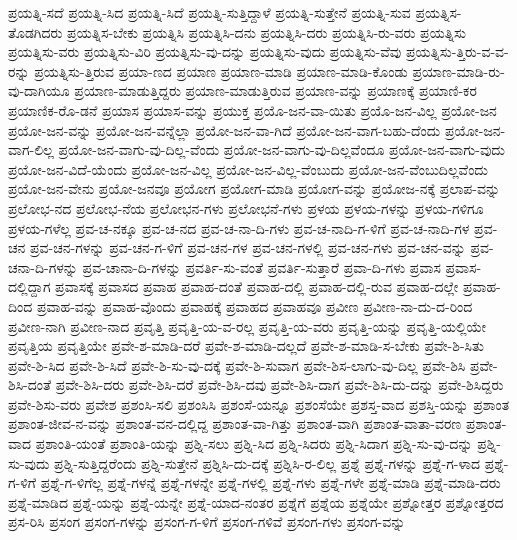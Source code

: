 {ಪ್ರಯತ್ನಿ-ಸದೆ
ಪ್ರಯತ್ನಿ-ಸಿದ
ಪ್ರಯತ್ನಿ-ಸಿದೆ
ಪ್ರಯತ್ನಿ-ಸುತ್ತಿದ್ದಾಳೆ
ಪ್ರಯತ್ನಿ-ಸುತ್ತೇನೆ
ಪ್ರಯತ್ನಿ-ಸುವ
ಪ್ರಯತ್ನಿಸ-ತೊಡಗಿದರು
ಪ್ರಯತ್ನಿಸ-ಬೇಕು
ಪ್ರಯತ್ನಿಸಿ
ಪ್ರಯತ್ನಿಸಿ-ದನು
ಪ್ರಯತ್ನಿಸಿ-ದರು
ಪ್ರಯತ್ನಿಸಿ-ರು-ವರು
ಪ್ರಯತ್ನಿಸು
ಪ್ರಯತ್ನಿಸು-ವರು
ಪ್ರಯತ್ನಿಸು-ವಿರಿ
ಪ್ರಯತ್ನಿಸು-ವು-ದನ್ನು
ಪ್ರಯತ್ನಿಸು-ವುದು
ಪ್ರಯತ್ನಿಸು-ವೆವು
ಪ್ರಯತ್ನಿಸು-ತ್ತಿರು-ವ-ವ-ರನ್ನು
ಪ್ರಯತ್ನಿಸು-ತ್ತಿರುವ
ಪ್ರಯಾ-ಣದ
ಪ್ರಯಾಣ
ಪ್ರಯಾಣ-ಮಾಡಿ
ಪ್ರಯಾಣ-ಮಾಡಿ-ಕೊಂಡು
ಪ್ರಯಾಣ-ಮಾಡಿ-ರು-ವು-ದಾಗಿಯೂ
ಪ್ರಯಾಣ-ಮಾಡುತ್ತಿದ್ದರು
ಪ್ರಯಾಣ-ಮಾಡುತ್ತಿರುವ
ಪ್ರಯಾಣ-ವನ್ನು
ಪ್ರಯಾಣಕ್ಕೆ
ಪ್ರಯಾಣಿ-ಕರ
ಪ್ರಯಾಣಿಕ-ರೊ-ಡನೆ
ಪ್ರಯಾಸ
ಪ್ರಯಾಸ-ವನ್ನು
ಪ್ರಯುಕ್ತ
ಪ್ರಯೊ-ಜನ-ವಾ-ಯಿತು
ಪ್ರಯೊ-ಜನ-ವಿಲ್ಲ
ಪ್ರಯೋ-ಜನ
ಪ್ರಯೋ-ಜನ-ವನ್ನು
ಪ್ರಯೋ-ಜನ-ವನ್ನೆಲ್ಲಾ
ಪ್ರಯೋ-ಜನ-ವಾ-ಗಿದೆ
ಪ್ರಯೋ-ಜನ-ವಾಗ-ಬಹು-ದೆಂದು
ಪ್ರಯೋ-ಜನ-ವಾಗ-ಲಿಲ್ಲ
ಪ್ರಯೋ-ಜನ-ವಾಗು-ವು-ದಿಲ್ಲ-ವೆಂದು
ಪ್ರಯೋ-ಜನ-ವಾಗು-ವು-ದಿಲ್ಲವೆಂದೂ
ಪ್ರಯೋ-ಜನ-ವಾಗು-ವುದು
ಪ್ರಯೋ-ಜನ-ವಿದೆ-ಯೆಂದು
ಪ್ರಯೋ-ಜನ-ವಿಲ್ಲ
ಪ್ರಯೋ-ಜನ-ವಿಲ್ಲ-ವೆಂಬುದು
ಪ್ರಯೋ-ಜನ-ವೆಂಬುದಿಲ್ಲವೆಂದು
ಪ್ರಯೋ-ಜನ-ವೇನು
ಪ್ರಯೋ-ಜನವೂ
ಪ್ರಯೋಗ
ಪ್ರಯೋಗ-ಮಾಡಿ
ಪ್ರಯೋಗ-ವನ್ನು
ಪ್ರಯೋಜ-ನಕ್ಕೆ
ಪ್ರಲಾಪ-ವನ್ನು
ಪ್ರಲೋಭ-ನದ
ಪ್ರಲೋಭ-ನೆಯ
ಪ್ರಲೋಭನ-ಗಳು
ಪ್ರಲೋಭನೆ-ಗಳು
ಪ್ರಳಯ
ಪ್ರಳಯ-ಗಳನ್ನು
ಪ್ರಳಯ-ಗಳಿಗೂ
ಪ್ರಳಯ-ಗಳೆಲ್ಲ
ಪ್ರವ-ಚ-ನಕ್ಕೂ
ಪ್ರವ-ಚ-ನದ
ಪ್ರವ-ಚ-ನಾ-ದಿ-ಗಳು
ಪ್ರವ-ಚ-ನಾದಿ-ಗ-ಳಿಗೆ
ಪ್ರವ-ಚ-ನಾದಿ-ಗಳ
ಪ್ರವ-ಚನ
ಪ್ರವ-ಚನ-ಗಳನ್ನು
ಪ್ರವ-ಚನ-ಗ-ಳಿಗೆ
ಪ್ರವ-ಚನ-ಗಳ
ಪ್ರವ-ಚನ-ಗಳಲ್ಲಿ
ಪ್ರವ-ಚನ-ಗಳು
ಪ್ರವ-ಚನ-ವನ್ನು
ಪ್ರವ-ಚನಾ-ದಿ-ಗಳನ್ನು
ಪ್ರವ-ಚಾನಾ-ದಿ-ಗಳನ್ನು
ಪ್ರವರ್ತಿ-ಸು-ವಂತೆ
ಪ್ರವರ್ತಿ-ಸುತ್ತಾರೆ
ಪ್ರವಾ-ದಿ-ಗಳು
ಪ್ರವಾಸ
ಪ್ರವಾಸ-ದಲ್ಲಿದ್ದಾಗ
ಪ್ರವಾಸಕ್ಕೆ
ಪ್ರವಾಸದ
ಪ್ರವಾಹ
ಪ್ರವಾಹ-ದಂತೆ
ಪ್ರವಾಹ-ದಲ್ಲಿ
ಪ್ರವಾಹ-ದಲ್ಲಿ-ರುವ
ಪ್ರವಾಹ-ದಲ್ಲೇ
ಪ್ರವಾಹ-ದಿಂದ
ಪ್ರವಾಹ-ವನ್ನು
ಪ್ರವಾಹ-ವೊಂದು
ಪ್ರವಾಹಕ್ಕೆ
ಪ್ರವಾಹದ
ಪ್ರವಾಹವೂ
ಪ್ರವೀಣ
ಪ್ರವೀಣ-ನಾ-ದು-ದ-ರಿಂದ
ಪ್ರವೀಣ-ನಾಗಿ
ಪ್ರವೀಣ-ನಾದ
ಪ್ರವೃತ್ತಿ
ಪ್ರವೃತ್ತಿ-ಯ-ವ-ರಲ್ಲ
ಪ್ರವೃತ್ತಿ-ಯ-ವರು
ಪ್ರವೃತ್ತಿ-ಯನ್ನು
ಪ್ರವೃತ್ತಿ-ಯಲ್ಲಿಯೇ
ಪ್ರವೃತ್ತಿಯ
ಪ್ರವೃತ್ತಿಯೇ
ಪ್ರವೇ-ಶ-ಮಾಡಿ-ದರೆ
ಪ್ರವೇ-ಶ-ಮಾಡಿ-ದಲ್ಲದೆ
ಪ್ರವೇ-ಶ-ಮಾಡಿ-ಸ-ಬೇಕು
ಪ್ರವೇ-ಶಿ-ಸಿತು
ಪ್ರವೇ-ಶಿ-ಸಿದ
ಪ್ರವೇ-ಶಿ-ಸಿದೆ
ಪ್ರವೇ-ಶಿ-ಸು-ವು-ದಕ್ಕೆ
ಪ್ರವೇ-ಶಿ-ಸುವಾಗ
ಪ್ರವೇ-ಶಿಸ-ಲಾಗು-ವು-ದಿಲ್ಲ
ಪ್ರವೇ-ಶಿಸಿ
ಪ್ರವೇ-ಶಿಸಿ-ದಂತೆ
ಪ್ರವೇ-ಶಿಸಿ-ದರು
ಪ್ರವೇ-ಶಿಸಿ-ದರೆ
ಪ್ರವೇ-ಶಿಸಿ-ದವು
ಪ್ರವೇ-ಶಿಸಿ-ದಾಗ
ಪ್ರವೇ-ಶಿಸಿ-ದು-ದನ್ನು
ಪ್ರವೇ-ಶಿಸಿದ್ದರು
ಪ್ರವೇ-ಶಿಸು-ವರು
ಪ್ರವೇಶ
ಪ್ರಶಂಸಿ-ಸಲಿ
ಪ್ರಶಂಸಿಸಿ
ಪ್ರಶಂಸೆ-ಯನ್ನೂ
ಪ್ರಶಂಸೆಯೇ
ಪ್ರಶಸ್ತ-ವಾದ
ಪ್ರಶಸ್ತಿ-ಯನ್ನು
ಪ್ರಶಾಂತ
ಪ್ರಶಾಂತ-ಜೀವ-ನ-ವನ್ನು
ಪ್ರಶಾಂತ-ವನ-ದಲ್ಲಿದ್ದ
ಪ್ರಶಾಂತ-ವಾ-ಗಿತ್ತು
ಪ್ರಶಾಂತ-ವಾಗಿ
ಪ್ರಶಾಂತ-ವಾತಾ-ವರಣ
ಪ್ರಶಾಂತ-ವಾದ
ಪ್ರಶಾಂತಿ-ಯಂತೆ
ಪ್ರಶಾಂತಿ-ಯನ್ನು
ಪ್ರಶ್ನಿ-ಸಲು
ಪ್ರಶ್ನಿ-ಸಿದ
ಪ್ರಶ್ನಿ-ಸಿದರು
ಪ್ರಶ್ನಿ-ಸಿದಾಗ
ಪ್ರಶ್ನಿ-ಸು-ವು-ದನ್ನು
ಪ್ರಶ್ನಿ-ಸು-ವುದು
ಪ್ರಶ್ನಿ-ಸುತ್ತಿದ್ದರೆಂದು
ಪ್ರಶ್ನಿ-ಸುತ್ತೇನೆ
ಪ್ರಶ್ನಿಸಿ-ದು-ದಕ್ಕೆ
ಪ್ರಶ್ನಿಸಿ-ರ-ಲಿಲ್ಲ
ಪ್ರಶ್ನೆ
ಪ್ರಶ್ನೆ-ಗಳನ್ನು
ಪ್ರಶ್ನೆ-ಗ-ಳಾದ
ಪ್ರಶ್ನೆ-ಗ-ಳಿಗೆ
ಪ್ರಶ್ನೆ-ಗ-ಳಿಗೆಲ್ಲ
ಪ್ರಶ್ನೆ-ಗಳನ್ನೆ
ಪ್ರಶ್ನೆ-ಗಳನ್ನೇ
ಪ್ರಶ್ನೆ-ಗಳಲ್ಲಿ
ಪ್ರಶ್ನೆ-ಗಳು
ಪ್ರಶ್ನೆ-ಗಳೇ
ಪ್ರಶ್ನೆ-ಮಾಡಿ
ಪ್ರಶ್ನೆ-ಮಾಡಿ-ದರು
ಪ್ರಶ್ನೆ-ಮಾಡಿದ
ಪ್ರಶ್ನೆ-ಯನ್ನು
ಪ್ರಶ್ನೆ-ಯನ್ನೇ
ಪ್ರಶ್ನೆ-ಯಾದ-ನಂತರ
ಪ್ರಶ್ನೆಗೆ
ಪ್ರಶ್ನೆಯ
ಪ್ರಶ್ನೆಯೇ
ಪ್ರಶ್ನೋತ್ತರ
ಪ್ರಶ್ನೋತ್ತರದ
ಪ್ರಸ-ರಿಸಿ
ಪ್ರಸಂಗ
ಪ್ರಸಂಗ-ಗಳನ್ನು
ಪ್ರಸಂಗ-ಗ-ಳಿಗೆ
ಪ್ರಸಂಗ-ಗಳಿವೆ
ಪ್ರಸಂಗ-ಗಳು
ಪ್ರಸಂಗ-ವನ್ನು
}
